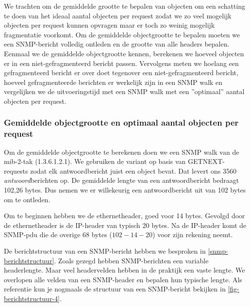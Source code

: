 We trachten om de gemiddelde grootte te bepalen van objecten om een schatting te doen van het ideaal aantal objecten per request
zodat we zo veel mogelijk objecten per request kunnen opvragen maar er toch zo weinig mogelijk fragmentatie voorkomt.
Om de gemiddelde objectgrootte te bepalen moeten we een SNMP-bericht volledig ontleden en de grootte van alle headers bepalen.
Eenmaal we de gemiddelde objectgrootte kennen, berekenen we hoeveel objecten er in een niet-gefragmenteerd bericht passen.
Vervolgens meten we hoelang een gefragmenteerd bericht er over doet tegenover een niet-gefragmenteerd bericht,
hoeveel gefragmenteerde berichten er werkelijk zijn in een SNMP walk en vergelijken we de uitvoeringstijd met
een SNMP walk met een ''optimaal'' aantal objecten per request.


\subsubsection{Gemiddelde objectgrootte en optimaal aantal objecten per request}

Om de gemiddelde objectgrootte te berekenen doen we een SNMP walk van de mib-2-tak (1.3.6.1.2.1).
We gebruiken de variant op basis van GETNEXT-requests zodat elk antwoordbericht juist een object bevat.
Dat levert ons 3560 \emph{antwoord}berichten op.
De gemiddelde lengte van een antwoordbericht bedraagt 102,26 bytes.
Dus nemen we er willekeurig een antwoordbericht uit van 102 bytes om te ontleden.

Om te beginnen hebben we de ethernetheader, goed voor 14 bytes\cite{ethernet-header}.
Gevolgd door de ethernetheader is de IP-header van typisch 20 bytes\cite{ipv4-header-wiki}.
Na de IP-header komt de SNMP-\gls{pdu} die de overige 68 bytes ($ 102 - 14 - 20$) voor zijn rekening neemt.

De berichtstructuur van een SNMP-bericht hebben we besproken in \cref{snmp-berichtstructuur}.
Zoals gezegd hebben SNMP-berichten een variable headerlengte.
Maar veel headervelden hebben in de praktijk een vaste lengte.
We overlopen alle velden van een SNMP-header en bepalen hun typische lengte.
Als referentie kun je nogmaals de structuur van een SNMP-bericht bekijken in \cref{fig-berichtstructuur-4}.

